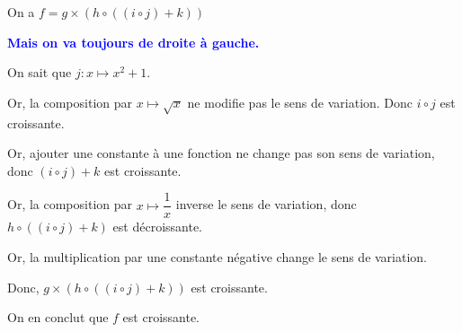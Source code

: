 On a $f = g \times \left( h \circ \left(\left(i \circ j\right)+k\right)\right)$

{\textcolor{Blue}{\bf Mais on va toujours de droite à gauche.}}

On sait que $j : x \mapsto x^2 +1$.

Or, la composition par $x \mapsto \sqrt{x}$ ne modifie pas le sens de variation. Donc $i \circ j$ est croissante.

Or, ajouter une constante à une fonction ne change pas son sens de variation, donc $(i \circ j) +k$ est croissante.

Or, la composition par $x \mapsto \dfrac{1}{x}$ inverse le sens de variation, donc $h\circ \left(\left(i\circ j\right)+k\right)$ est décroissante. 

Or, la multiplication par une constante négative change le sens de variation.

Donc, $g \times \left( h\circ \left(\left(i\circ j\right)+k\right) \right)$ est croissante. 

On en conclut que $f$ est croissante. 





